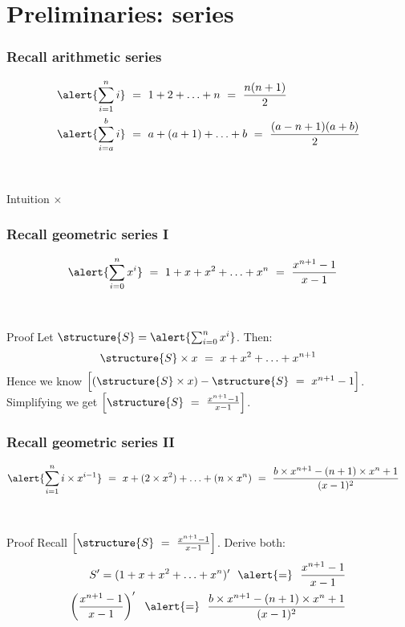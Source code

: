 \documentclass[aspectratio=169]{beamer}
\begin{document}
\section{Preliminaries: series}


\begin{frame}\frametitle{Recall arithmetic series}
    
\begin{align*}
  \alert{\sum_{i=1}^n i} &~=~ 1 + 2 + \ldots + n ~=~ \frac{n(n+1)}{2}
  \\
  \alert{\sum_{i=a}^b i} &~=~ a + (a+1) + \ldots + b ~=~
    \frac{(a-n+1)(a+b)}{2}
\end{align*}

~\\[8mm]

\begin{block}{Intuition}
\centering
{} $\times$   
\end{block}
\end{frame}

\begin{frame}\frametitle{Recall geometric series I} 
\begin{align*}
  \alert{\sum_{i=0}^n x^i} &~=~ 1 + x + x^2 + \ldots + x^n ~=~
      \frac{x^{n+1}-1}{x-1}
\end{align*}

~\\[2mm]

\begin{block}{Proof}
\centering
Let $\structure{S}=\alert{\sum_{i=0}^n x^i}$. Then:
$$\structure{S}\times x ~=~ x + x^2 + \ldots + x^{n+1}$$
Hence we know $\Big[(\structure{S}\times x)-\structure{S} ~=~ x^{n+1}-1\Big]$.
\\
Simplifying we get $\Big[\structure{S} ~=~ \frac{x^{n+1}-1}{x-1}\Big]$.
\end{block}
\end{frame}

\begin{frame}\frametitle{Recall geometric series II}
\begin{align*}
  \alert{\sum_{i=1}^n i \times x^{i-1}} &~=~ x + (2\times x^2) + \ldots + (n\times x^n) ~=~
      \frac{b\times x^{n+1}-(n+1)\times x^n +1}{(x-1)^2}
\end{align*}

~\\[2mm]

\begin{block}{Proof}
\centering
Recall $\Big[\structure{S} ~=~ \frac{x^{n+1}-1}{x-1}\Big]$.
Derive both:
\begin{align*}
 S' = (1 + x + x^2 + \ldots + x^n)'~~\alert{=}~~\frac{x^{n+1}-1}{x-1}
\\
\left(\frac{x^{n+1}-1}{x-1}\right)'~~\alert{=}~~
   \frac{b\times x^{n+1}-(n+1)\times x^n +1}{(x-1)^2}
\end{align*}
\end{block}
\end{frame}
\end{document}
